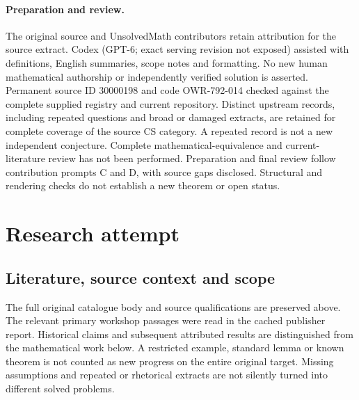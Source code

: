 \documentclass[11pt]{article}
\begin{document}
\paragraph{Preparation and review.}
The original source and UnsolvedMath contributors retain attribution for the source extract. Codex (GPT-6; exact serving revision not exposed) assisted with definitions, English summaries, scope notes and formatting. No new human mathematical authorship or independently verified solution is asserted. Permanent source ID 30000198 and code OWR-792-014 checked against the complete supplied registry and current repository. Distinct upstream records, including repeated questions and broad or damaged extracts, are retained for complete coverage of the source CS category. A repeated record is not a new independent conjecture. Complete mathematical-equivalence and current-literature review has not been performed. Preparation and final review follow contribution prompts C and D, with source gaps disclosed. Structural and rendering checks do not establish a new theorem or open status.
\label{end:30000198}

\section{Research attempt}
\subsection{Literature, source context and scope}
The full original catalogue body and source qualifications are preserved above. The relevant primary workshop passages were read in the cached publisher report. Historical claims and subsequent attributed results are distinguished from the mathematical work below. A restricted example, standard lemma or known theorem is not counted as new progress on the entire original target. Missing assumptions and repeated or rhetorical extracts are not silently turned into different solved problems.
\end{document}
